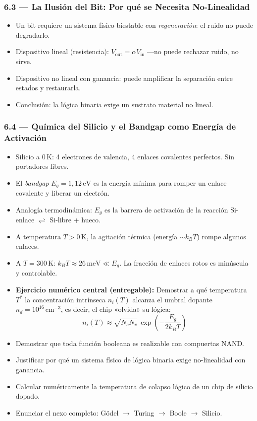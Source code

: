 \documentclass[11pt, letterpaper]{article}
\begin{document}
\subsubsection{6.3 — La Ilusión del Bit: Por qué se Necesita No-Linealidad}
\begin{itemize}
  \item Un bit requiere un sistema físico biestable con \emph{regeneración}: el ruido no puede degradarlo.
  \item Dispositivo lineal (resistencia): $V_\text{out}=\alpha V_\text{in}$ —no puede rechazar ruido, no sirve.
  \item Dispositivo no lineal con ganancia: puede amplificar la separación entre estados y restaurarla.
  \item Conclusión: la lógica binaria exige un sustrato material no lineal.
\end{itemize}

\subsubsection{6.4 — Química del Silicio y el Bandgap como Energía de Activación}
\begin{itemize}
  \item Silicio a $0\,\text{K}$: 4 electrones de valencia, 4 enlaces covalentes perfectos. Sin portadores libres.
  \item El \emph{bandgap} $E_g = 1{,}12\,\text{eV}$ es la energía mínima para romper un enlace covalente y liberar un electrón.
  \item Analogía termodinámica: $E_g$ es la barrera de activación de la reacción Si-enlace $\rightleftharpoons$ Si-libre + hueco.
  \item A temperatura $T>0\,\text{K}$, la agitación térmica (energía $\sim k_B T$) rompe algunos enlaces.
  \item A $T=300\,\text{K}$: $k_B T \approx 26\,\text{meV} \ll E_g$. La fracción de enlaces rotos es minúscula y controlable.
  \item \textbf{Ejercicio numérico central (entregable):}
    Demostrar a qué temperatura $T^*$ la concentración intrínseca $n_i(T)$ alcanza el umbral dopante
    $n_d = 10^{16}\,\text{cm}^{-3}$, es decir, el chip «olvida» su lógica:
    \[n_i(T)\approx\sqrt{N_c N_v}\,\exp\!\left(-\frac{E_g}{2k_BT}\right)\]
\end{itemize}

\begin{objetivos}
\begin{itemize}
  \item Demostrar que toda función booleana es realizable con compuertas NAND.
  \item Justificar por qué un sistema físico de lógica binaria exige no-linealidad con ganancia.
  \item Calcular numéricamente la temperatura de colapso lógico de un chip de silicio dopado.
  \item Enunciar el nexo completo: Gödel $\to$ Turing $\to$ Boole $\to$ Silicio.
\end{itemize}
\end{objetivos}
\end{document}
